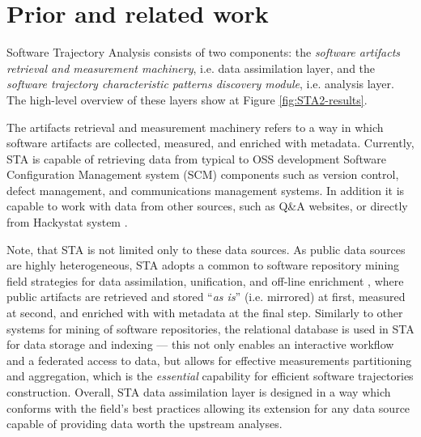 \chapter{Prior and related work}\label{chapter_background_work}
Software Trajectory Analysis consists of two components: 
the \textit{software artifacts retrieval and measurement machinery}, i.e. data assimilation layer, 
and the \textit{software trajectory characteristic patterns discovery module}, i.e. analysis layer. 
The high-level overview of these layers show at Figure \ref{fig:STA2-results}.

The artifacts retrieval and measurement machinery refers to a way in which software artifacts are 
collected, measured, and enriched with metadata. 
Currently, STA is capable of retrieving data from typical to OSS development Software Configuration 
Management system (SCM) components such as version control, defect management, and communications 
management systems. In addition it is capable to work with data from other sources, such as Q\&A 
websites, or directly from Hackystat system \cite{csdl2-10-09}.

Note, that STA is not limited only to these data sources.
As public data sources are highly heterogeneous, STA adopts a common to software repository mining 
field strategies for data assimilation, unification, and off-line enrichment \cite{german04_softchange}, 
where public artifacts are retrieved and stored ``\textit{as is}'' (i.e. mirrored) at first, 
measured at second, and enriched with with metadata at the final step.
Similarly to other systems for mining of software repositories, the relational database is used in STA 
for data storage and indexing --- this not only enables an interactive workflow and a federated access to 
data, but allows for effective measurements partitioning and aggregation, which is the \textit{essential} 
capability for efficient software trajectories construction.
Overall, STA data assimilation layer is designed in a way which conforms with the field's best practices
allowing its extension for any data source capable of providing data worth the upstream analyses.

